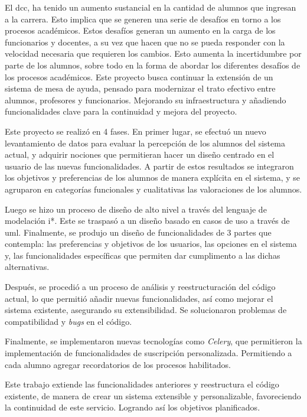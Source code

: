 \begin{resumen}
   \par El \acrfull{dcc}, ha tenido un aumento sustancial en la cantidad de alumnos que ingresan a la carrera. Esto implica que se generen una serie de desafíos en torno a los procesos académicos. Estos desafíos generan un aumento en la carga de los funcionarios y docentes, a su vez que hacen que no se pueda responder con la velocidad necesaria que requieren los cambios. Esto aumenta la incertidumbre por parte de los alumnos, sobre todo en la forma de abordar los diferentes desafíos de los procesos académicos. Este proyecto busca continuar la extensión de un sistema de mesa de ayuda, pensado para modernizar el trato efectivo entre alumnos, profesores y funcionarios. Mejorando su infraestructura y añadiendo funcionalidades clave para la continuidad y mejora del proyecto.

   \par Este proyecto se realizó en 4 fases. En primer lugar, se efectuó un nuevo levantamiento de datos para evaluar la percepción de los alumnos del sistema actual, y adquirir nociones que permitieran hacer un diseño centrado en el usuario de las nuevas funcionalidades. A partir de estos resultados se integraron los objetivos y preferencias de los alumnos de manera explícita en el sistema, y se agruparon en categorías funcionales y cualitativas las valoraciones de los alumnos.

   \par Luego se hizo un proceso de diseño de alto nivel a través del lenguaje de modelación \gls{i*}. Este se traspasó a un diseño basado en casos de uso a través de \acrshort{uml}. Finalmente, se produjo un diseño de funcionalidades de 3 partes que contempla: las preferencias y objetivos de los usuarios, las opciones en el sistema y, las funcionalidades específicas que permiten dar cumplimento a las dichas alternativas.

   \par Después, se procedió a un proceso de análisis y reestructuración del código actual, lo que permitió añadir nuevas funcionalidades, así como mejorar el sistema existente, asegurando su extensibilidad. Se solucionaron problemas de compatibilidad y \textit{bugs} en el código.

   \par Finalmente, se implementaron nuevas tecnologías como \textit{\gls{Celery}}, que permitieron la implementación de funcionalidades de suscripción personalizada. Permitiendo a cada alumno agregar recordatorios de los procesos habilitados.

   \par Este trabajo extiende las funcionalidades anteriores y reestructura el código existente, de manera de crear un sistema extensible y personalizable, favoreciendo la continuidad de este servicio. Logrando así los objetivos planificados.
   
\end{resumen}